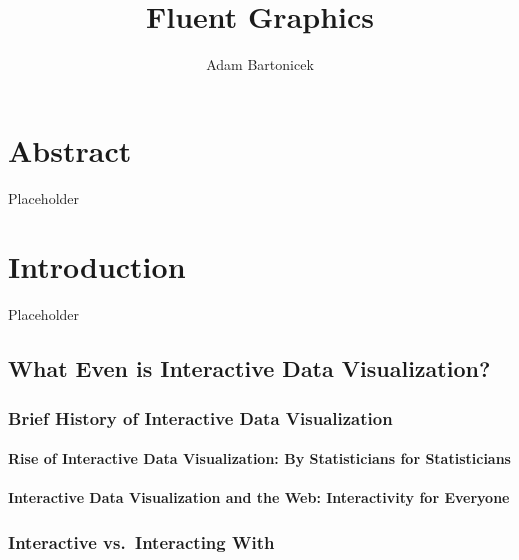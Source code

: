 \documentclass[
]{book}
\title{Fluent Graphics}
\author{Adam Bartonicek}
\date{}
\begin{document}
\maketitle

{
\setcounter{tocdepth}{1}
\tableofcontents
}
\hypertarget{abstract}{%
\chapter{Abstract}\label{abstract}}

Placeholder

\hypertarget{introduction}{%
\chapter{Introduction}\label{introduction}}

Placeholder

\hypertarget{what-even-is-interactive-data-visualization}{%
\section{What Even is Interactive Data Visualization?}\label{what-even-is-interactive-data-visualization}}

\hypertarget{brief-history-of-interactive-data-visualization}{%
\subsection{Brief History of Interactive Data Visualization}\label{brief-history-of-interactive-data-visualization}}

\hypertarget{rise-of-interactive-data-visualization-by-statisticians-for-statisticians}{%
\subsubsection{Rise of Interactive Data Visualization: By Statisticians for Statisticians}\label{rise-of-interactive-data-visualization-by-statisticians-for-statisticians}}

\hypertarget{interactive-data-visualization-and-the-web-interactivity-for-everyone}{%
\subsubsection{Interactive Data Visualization and the Web: Interactivity for Everyone}\label{interactive-data-visualization-and-the-web-interactivity-for-everyone}}

\hypertarget{interactive-vs.-interacting-with}{%
\subsection{Interactive vs.~Interacting With}\label{interactive-vs.-interacting-with}}
\end{document}
